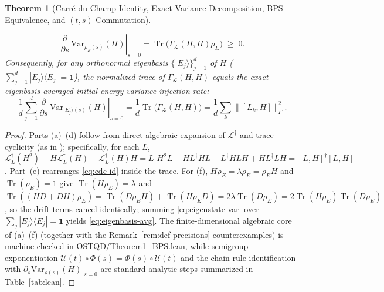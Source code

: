 \documentclass[11pt,a4paper]{article}
\newtheorem{theorem}{Theorem}
\theoremstyle{definition}
\theoremstyle{remark}
\newcommand{\Tr}{\operatorname{Tr}}
\newcommand{\cL}{\mathcal{L}}
\newcommand{\cU}{\mathcal{U}}
\newcommand{\1}{\mathbf{1}}
\newcommand{\normF}[1]{\|#1\|_F}
\newcommand{\code}[1]{{\footnotesize\ttfamily #1}}
\begin{document}
\begin{theorem}[Carr\'e du Champ Identity, Exact Variance Decomposition, BPS Equivalence, and $(t,s)$ Commutation]
\begin{enumerate}
  \begin{equation}\label{eq:eigenstate-var}
    \left.\frac{\partial}{\partial s}\,\mathrm{Var}_{\rho_E(s)}(H)\right|_{s=0} = \Tr\bigl(\Gamma_{\cL}(H,H)\rho_E\bigr) \;\ge\; 0.
  \end{equation}
  Consequently, for any orthonormal eigenbasis $\{|E_j\rangle\}_{j=1}^d$ of $H$ ($\sum_{j=1}^d |E_j\rangle\langle E_j| = \1$), the normalized trace of $\Gamma_{\cL}(H,H)$ equals the exact \emph{eigenbasis-averaged initial energy-variance injection rate}:
  \begin{equation}\label{eq:eigenbasis-avg}
    \frac{1}{d}\sum_{j=1}^d \left.\frac{\partial}{\partial s}\,\mathrm{Var}_{|E_j\rangle(s)}(H)\right|_{s=0}
    = \frac{1}{d}\Tr\bigl(\Gamma_{\cL}(H,H)\bigr)
    = \frac{1}{d}\sum_k \normF{[L_k, H]}^2.
  \end{equation}
\end{enumerate}
\end{theorem}

\begin{proof}
Parts (a)--(d) follow from direct algebraic expansion of $\cL^\dagger$ and trace cyclicity (as in \cite{Lindblad1976,BPS1984}); specifically, for each $L$, $\cL_L^\dagger(H^2) - H\cL_L^\dagger(H) - \cL_L^\dagger(H)H = L^\dagger H^2 L - H L^\dagger H L - L^\dagger H L H + H L^\dagger L H = [L,H]^\dagger[L,H]$. Part~(e) rearranges \eqref{eq:cdc-id} inside the trace. For (f), $H\rho_E = \lambda\rho_E = \rho_E H$ and $\Tr(\rho_E)=1$ give $\Tr(H\rho_E)=\lambda$ and $\Tr((HD+DH)\rho_E) = \Tr(D\rho_E H) + \Tr(H\rho_E D) = 2\lambda\Tr(D\rho_E) = 2\Tr(H\rho_E)\Tr(D\rho_E)$, so the drift terms cancel identically; summing \eqref{eq:eigenstate-var} over $\sum_j |E_j\rangle\langle E_j| = \1$ yields \eqref{eq:eigenbasis-avg}. The finite-dimensional algebraic core of (a)--(f) (together with the Remark~\ref{rem:def-precisions} counterexamples) is machine-checked in \code{OSTQD/Theorem1\_BPS.lean}, while semigroup exponentiation $\cU(t)\circ\Phi(s)=\Phi(s)\circ\cU(t)$ and the chain-rule identification with $\partial_s\mathrm{Var}_{\rho(s)}(H)|_{s=0}$ are standard analytic steps summarized in Table~\ref{tab:lean}.
\end{proof}
\end{document}
